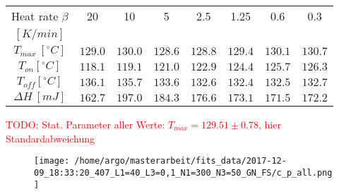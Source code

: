\documentclass{scrartcl}[12pt, halfparskip]
\numberwithin{equation}{section}
\numberwithin{figure}{section}
\numberwithin{table}{section}
\newcommand{\todo}[1]{\textcolor{red}{TODO: #1}}
\begin{document}
\begin{table}[H]
	\centering
	\begin{tabular}{| c | c | c | c | c | c | c | c |} \hline
		Heat rate $\beta$ & 20 & 10 & 5 & 2.5 & 1.25 & 0.6 & 0.3 \\
		$[K/min]$ & & & & & & & \\ \hline
		$T_{max} \ [^{\circ}C]$ & $129.0$ & $130.0$ & $128.6$ & $128.8$ & $129.4$ & $130.1$ & $130.7$ \\[0.7ex]
		$T_{on} [^{\circ} C]$ & $118.1$ & $119.1$ & $121.0$ & $122.9$ & $124.4$ & $125.7$ & $126.3$ \\[0.7ex]
		$T_{off} [^{\circ} C]$ & $136.1$ & $135.7$ & $133.6$ & $132.6$ & $132.4$ & $132.5$ & $132.7$ \\[0.7ex]
		$\Delta H \ [mJ]$ & $162.7$ & $197.0$ & $184.3$ & $176.6$ & $173.1$ & $171.5$ & $172.2$ \\ \hline
	\end{tabular}
	\caption{}
	\label{fig:eval_table_Tmax_deltaH_FS}
\end{table}

\todo{Stat. Parameter aller Werte: $T_{max} = 129.51 \pm 0.78$, hier Standardabweichung}


\begin{figure}[H]
	\centering
	\texttt{[image: /home/argo/masterarbeit/fits\_data/2017-12-09\_18:33:20\_407\_L1=40\_L3=0,1\_N1=300\_N3=50\_GN\_FS/c\_p\_all.png]}
	\caption{}
	\label{fig:FS_all_c_p}
\end{figure}
\end{document}
